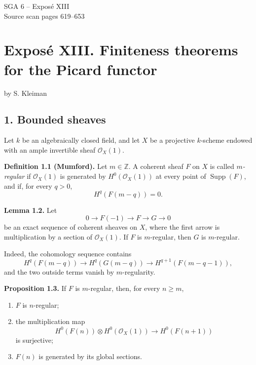 \documentclass[11pt]{article}
\begin{document}
\providecommand{\Ass}{\operatorname{Ass}}
\providecommand{\Hom}{\operatorname{Hom}}
\providecommand{\Ext}{\operatorname{Ext}}
\providecommand{\Proj}{\operatorname{Proj}}
\providecommand{\NS}{\operatorname{NS}}
\providecommand{\Tors}{\operatorname{Tors}}
\providecommand{\Picnum}{\operatorname{Pic}^{\mathrm{num}}}
\providecommand{\Piczero}{\operatorname{Pic}^{0}}
\providecommand{\Pictau}{\operatorname{Pic}^{\tau}}
\providecommand{\length}{\operatorname{length}}
\providecommand{\etale}{\text{\'etale}}

\begin{center}
{\Large SGA 6 -- Expos\'e XIII}\\[0.4em]
{\large Source scan pages 619--653}
\end{center}

\section*{Expos\'e XIII. Finiteness theorems for the Picard functor}
\begin{center}
by S. Kleiman
\end{center}

\subsection*{1. Bounded sheaves}
Let $k$ be an algebraically closed field, and let $X$ be a projective $k$-scheme endowed with an ample invertible sheaf $\mathcal O_X(1)$.

\textbf{Definition 1.1 (Mumford).} Let $m\in\mathbb Z$. A coherent sheaf $F$ on $X$ is called \emph{$m$-regular} if $\mathcal O_X(1)$ is generated by $H^0(\mathcal O_X(1))$ at every point of $\operatorname{Supp}(F)$, and if, for every $q>0$,
\[
 H^q(F(m-q))=0.
\]

\textbf{Lemma 1.2.} Let
\[
0\longrightarrow F(-1)\longrightarrow F\longrightarrow G\longrightarrow 0
\]
be an exact sequence of coherent sheaves on $X$, where the first arrow is multiplication by a section of $\mathcal O_X(1)$. If $F$ is $m$-regular, then $G$ is $m$-regular.

Indeed, the cohomology sequence contains
\[
H^q(F(m-q))\longrightarrow H^q(G(m-q))\longrightarrow H^{q+1}(F(m-q-1)),
\]
and the two outside terms vanish by $m$-regularity.

\textbf{Proposition 1.3.} If $F$ is $m$-regular, then, for every $n\geq m$,
\begin{enumerate}[label=\roman*)]
\item $F$ is $n$-regular;
\item the multiplication map
\[
 H^0(F(n))\otimes H^0(\mathcal O_X(1))\longrightarrow H^0(F(n+1))
\]
is surjective;
\item $F(n)$ is generated by its global sections.
\end{enumerate}
\end{document}

